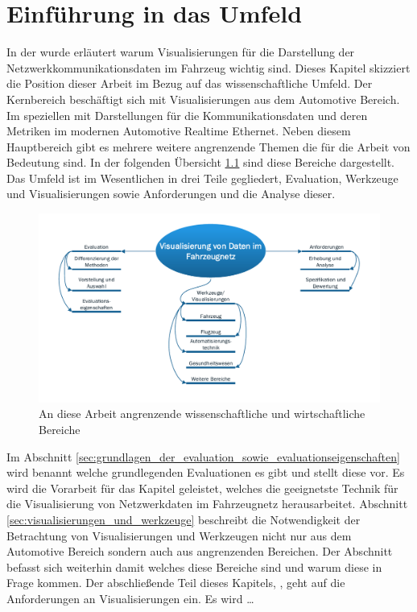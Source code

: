 \documentclass[draft=false
              ,paper=a4
              ,twoside=false
              ,fontsize=11pt
              ,headsepline
              ,BCOR10mm
              ,DIV11
              ]{scrbook}
\begin{document}
\chapter{Einführung in das Umfeld} %
\label{cha:umfeldanalyse}
In der  wurde erläutert warum Visualisierungen für die Darstellung der Netzwerkkommunikationsdaten im Fahrzeug wichtig sind. Dieses Kapitel skizziert die Position dieser Arbeit im Bezug auf das wissenschaftliche Umfeld. Der Kernbereich beschäftigt sich mit Visualisierungen aus dem Automotive Bereich. Im speziellen mit Darstellungen für die Kommunikationsdaten und deren Metriken im modernen Automotive Realtime Ethernet. Neben diesem Hauptbereich gibt es mehrere weitere angrenzende Themen die für die Arbeit von Bedeutung sind. In der folgenden Übersicht \ref{fig:theme_overview} sind diese Bereiche dargestellt. Das Umfeld ist im Wesentlichen in drei Teile gegliedert, Evaluation, Werkzeuge und Visualisierungen sowie Anforderungen und die Analyse dieser. 

\begin{figure}[htbp]
  \centering
  \includegraphics[width=\textwidth]{img/theme_overview.pdf}
  \caption{An diese Arbeit angrenzende wissenschaftliche und wirtschaftliche Bereiche}
  \label{fig:theme_overview}
\end{figure}

Im Abschnitt \ref{sec:grundlagen_der_evaluation_sowie_evaluationseigenschaften} wird benannt welche grundlegenden Evaluationen es gibt und stellt diese vor. Es wird die Vorarbeit für das Kapitel  geleistet, welches die geeignetste Technik für die Visualisierung von Netzwerkdaten im Fahrzeugnetz herausarbeitet. Abschnitt \ref{sec:visualisierungen_und_werkzeuge} beschreibt die Notwendigkeit der Betrachtung von Visualisierungen und Werkzeugen nicht nur aus dem Automotive Bereich sondern auch aus angrenzenden Bereichen. Der Abschnitt befasst sich weiterhin damit welches diese Bereiche sind und warum diese in Frage kommen. Der abschließende Teil dieses Kapitels, , geht auf die Anforderungen an Visualisierungen ein. Es wird \dots 
\end{document}
